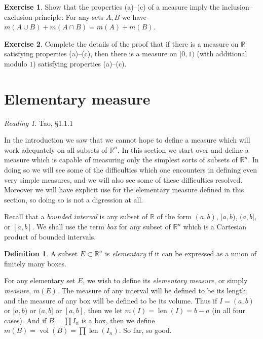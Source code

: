 \documentclass[11pt,oneside]{amsbook}
\newcommand{\RR}{{\mathbb R}}
\DeclareMathOperator{\len}{len}
\DeclareMathOperator{\vol}{vol}
\theoremstyle{definition}
\newtheorem{exerc}{Exercise}[section]
\theoremstyle{plain}
\theoremstyle{definition}
\newtheorem{defn}[thm]{Definition}
\theoremstyle{remark}
\newtheorem*{reading}{Reading}
\numberwithin{equation}{section}
\numberwithin{figure}{section}
\begin{document}
\begin{exerc}
  Show that the properties (a)--(c) of a measure imply the inclusion--exclusion principle: For any sets $A,B$ we have $m(A\cup B)+m(A\cap B)=m(A)+m(B)$.
\end{exerc}

\begin{exerc}
  Complete the details of the proof that if there is a measure on $\RR$ satisfying properties (a)--(c), then there is a measure on $[0,1)$ (with additional modulo $1$) satisfying properties (a)--(c).
\end{exerc}

\newpage
\section{Elementary measure}

\begin{reading}
  Tao, \S1.1.1
\end{reading}

In the introduction we saw that we cannot hope to define a measure which will work adequately on all subsets of $\RR^n$. In this section we start over and define a measure which is capable of measuring only the simplest sorts of subsets of $\RR^n$. In doing so we will see some of the difficulties which one encounters in defining even very simple measures, and we will also see some of these difficulties resolved. Moreover we will have explicit use for the elementary measure defined in this section, so doing so is not a digression at all.

Recall that a \emph{bounded interval} is any subset of $\RR$ of the form $(a,b)$, $[a,b)$, $(a,b]$, or $[a,b]$. We shall use the term \emph{box} for any subset of $\RR^n$ which is a Cartesian product of bounded intervals.

\begin{defn}
  A subset $E\subset\RR^n$ is \emph{elementary} if it can be expressed as a union of finitely many boxes.
\end{defn}

For any elementary set $E$, we wish to define its \emph{elementary measure}, or simply \emph{measure}, $m(E)$. The measure of any interval will be defined to be its length, and the measure of any box will be defined to be its volume. Thus if $I=(a,b)$ or $[a,b)$ or $(a,b]$ or $[a,b]$, then we let $m(I)=\len(I)=b-a$ (in all four cases). And if $B=\prod I_n$ is a box, then we define $m(B)=\vol(B)=\prod\len(I_n)$. So far, so good.
\end{document}
